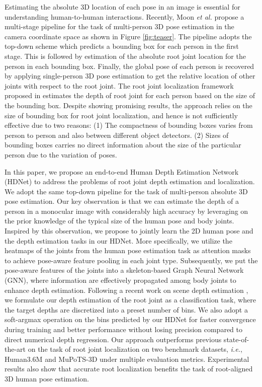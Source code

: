 \documentclass[runningheads]{llncs}
\begin{document}
Estimating the absolute 3D location of each pose in an image is essential for understanding human-to-human interactions.
Recently, Moon \textit{et al.} \cite{Moon_2019_ICCV_3DMPPE} propose a multi-stage pipeline for the task of multi-person 3D pose estimation in the camera coordinate space as shown in Figure \ref{fig:teaser}. The pipeline adopts the top-down scheme which predicts a bounding box for each person in the first stage. 
This is followed by estimation of the absolute root joint location for the person in each bounding box. Finally, the global pose of each person is recovered by applying single-person 3D pose estimation to get the relative location of other joints with respect to the root joint. 
The root joint localization framework proposed in \cite{Moon_2019_ICCV_3DMPPE} estimates the depth of root joint for each person based on the size of the bounding box. Despite showing promising results, the approach relies on the size of bounding box for root joint localization, and hence is not sufficiently effective due to two reasons: (1) The compactness of bounding boxes varies from person to person and also between different object detectors. (2) Sizes of bounding boxes carries no direct information about the size of the particular person due to the variation of poses.

In this paper, we propose an end-to-end Human Depth Estimation Network (HDNet) to address the problems of root joint depth estimation and localization. 
We adopt the same top-down pipeline for the task of multi-person absolute 3D pose estimation.
Our key observation is that we can estimate the depth of a person in a monocular image with considerably high accuracy by leveraging on the prior knowledge of the typical size of the human pose and body joints.
Inspired by this observation, 
we propose to jointly learn the 2D human pose and the depth estimation tasks in our HDNet.
More specifically, we utilize the heatmaps of the joints from the human pose estimation task as attention masks to achieve pose-aware feature pooling in each joint type.
Subsequently, we put the pose-aware features of the joints into a skeleton-based Graph Neural Network (GNN), where information are effectively propagated among body joints to enhance depth estimation.
Following a recent work on scene depth estimation \cite{fu2018deep}, we formulate our depth estimation of the root joint as a classification task, where the target depths are discretized into a preset number of bins.
We also adopt a soft-argmax operation on the bins predicted by our HDNet for faster convergence during training and better performance without losing precision compared to direct numerical depth regression.
Our approach outperforms previous state-of-the-art \cite{Moon_2019_ICCV_3DMPPE} on the task of root joint localization on two benchmark datasets, \textit{i.e.}, Human3.6M \cite{ionescu2014human3} and MuPoTS-3D \cite{singleshotmultiperson2018} under multiple evaluation metrics. 
Experimental results also show that accurate root localization benefits the task of root-aligned 3D human pose estimation.
\end{document}
